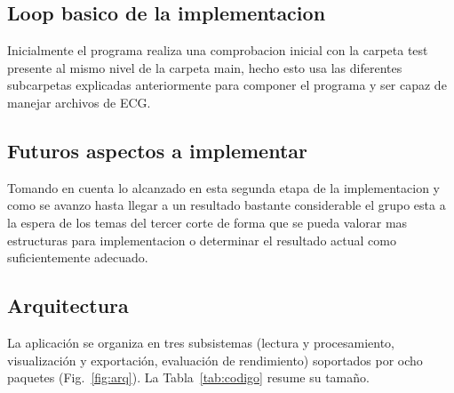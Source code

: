 \subsection{Loop basico de la implementacion}
Inicialmente el programa realiza una comprobacion inicial con la carpeta test presente al mismo nivel de la carpeta main, hecho esto usa las diferentes subcarpetas explicadas anteriormente para componer el programa y ser capaz de manejar archivos de ECG.
\subsection{Futuros aspectos a implementar}
Tomando en cuenta lo alcanzado en esta segunda etapa de la implementacion y como se avanzo hasta llegar a un resultado bastante considerable el grupo esta a la espera de los temas del tercer corte de forma que se pueda valorar mas estructuras para implementacion o determinar el resultado actual como suficientemente adecuado.
\subsection{Arquitectura}
La aplicación se organiza en tres subsistemas (lectura y procesamiento, visualización y exportación, evaluación de rendimiento) soportados por ocho paquetes (Fig.~\ref{fig:arq}). La Tabla~\ref{tab:codigo} resume su tamaño.

